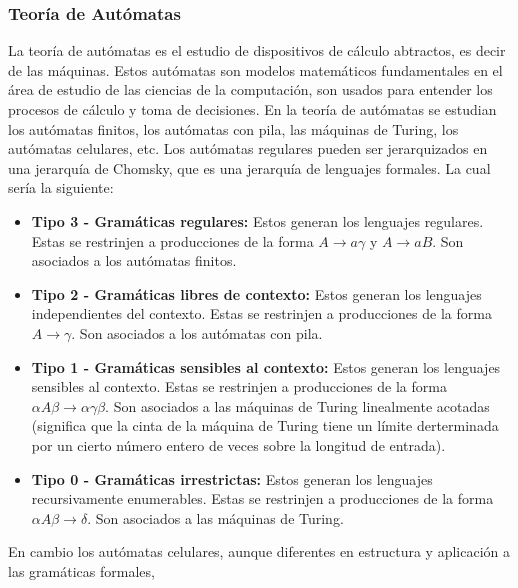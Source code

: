\subsubsection{Teor\'ia de Aut\'omatas}
    \label{sec:TeoriaAutomatas}
    La teor\'ia de aut\'omatas es el estudio de dispositivos de c\'alculo abtractos, es decir de las m\'aquinas.\cite{Hopcroft1979}
        Estos aut\'omatas son modelos matem\'aticos fundamentales en el \'area de estudio de las ciencias de la computaci\'on, 
        son usados para entender los procesos de c\'alculo y toma de decisiones. En la teor\'ia de aut\'omatas se estudian
        los aut\'omatas finitos, los aut\'omatas con pila, las m\'aquinas de Turing, los aut\'omatas celulares, etc.
        Los aut\'omatas regulares pueden ser jerarquizados en una jerarqu\'ia de Chomsky, que es una jerarqu\'ia de lenguajes formales.
        La cual ser\'ia la siguiente\cite{Aranda2006}:
        \begin{itemize}
            \item \textbf{Tipo 3 - Gram\'aticas regulares:} Estos generan los lenguajes regulares.
                Estas se restrinjen a producciones de la forma $A \rightarrow a\gamma$ y $A \rightarrow aB$. Son 
                asociados a los aut\'omatas finitos.
            \item \textbf{Tipo 2 - Gram\'aticas libres de contexto:} Estos generan los lenguajes independientes del contexto.
                Estas se restrinjen a producciones de la forma $A \rightarrow \gamma$. Son asociados a los aut\'omatas con pila.
            \item \textbf{Tipo 1 - Gram\'aticas sensibles al contexto:} Estos generan los lenguajes sensibles al contexto.
                Estas se restrinjen a producciones de la forma ${\alpha}A{\beta} \rightarrow {\alpha}{\gamma}{\beta}$. 
                Son asociados a las m\'aquinas de Turing linealmente acotadas (significa que la cinta de la m\'aquina de Turing
                tiene un l\'imite derterminada por un cierto n\'umero entero de veces sobre la longitud de entrada).
            \item \textbf{Tipo 0 - Gram\'aticas irrestrictas:} Estos generan los lenguajes recursivamente enumerables.
                Estas se restrinjen a producciones de la forma ${\alpha}A{\beta} \rightarrow {\delta}$. Son asociados a las m\'aquinas de Turing.
        \end{itemize}
    \vskip 0.5cm
    En cambio los aut\'omatas celulares, aunque diferentes en estructura y aplicaci\'on a las gram\'aticas formales, 
